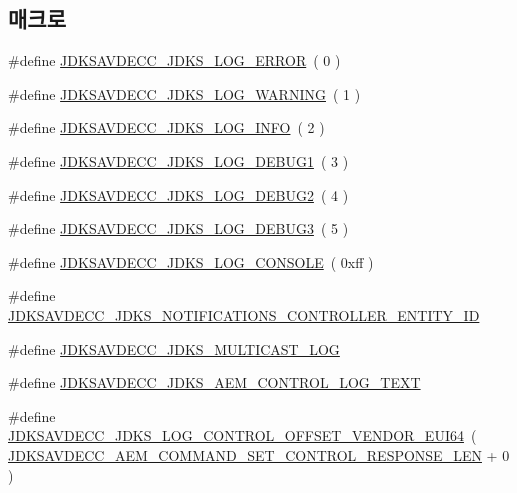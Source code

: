 \subsection*{매크로}
\begin{DoxyCompactItemize}
\item 
\#define \hyperlink{group__jdks__log_gab4244a790ff2c0aa1fa3a077b7b7e935}{J\+D\+K\+S\+A\+V\+D\+E\+C\+C\+\_\+\+J\+D\+K\+S\+\_\+\+L\+O\+G\+\_\+\+E\+R\+R\+OR}~( 0 )
\item 
\#define \hyperlink{group__jdks__log_gab00fb723ba991ceb1e80dfb91b91af5d}{J\+D\+K\+S\+A\+V\+D\+E\+C\+C\+\_\+\+J\+D\+K\+S\+\_\+\+L\+O\+G\+\_\+\+W\+A\+R\+N\+I\+NG}~( 1 )
\item 
\#define \hyperlink{group__jdks__log_ga21fdc8ed4fe36814540b461a4b72d9eb}{J\+D\+K\+S\+A\+V\+D\+E\+C\+C\+\_\+\+J\+D\+K\+S\+\_\+\+L\+O\+G\+\_\+\+I\+N\+FO}~( 2 )
\item 
\#define \hyperlink{group__jdks__log_ga64e80ebc82c6c88ac37806ac0da6cef0}{J\+D\+K\+S\+A\+V\+D\+E\+C\+C\+\_\+\+J\+D\+K\+S\+\_\+\+L\+O\+G\+\_\+\+D\+E\+B\+U\+G1}~( 3 )
\item 
\#define \hyperlink{group__jdks__log_ga4ed4c60943c2bf8efe5670badab16a79}{J\+D\+K\+S\+A\+V\+D\+E\+C\+C\+\_\+\+J\+D\+K\+S\+\_\+\+L\+O\+G\+\_\+\+D\+E\+B\+U\+G2}~( 4 )
\item 
\#define \hyperlink{group__jdks__log_ga04ac1c6799542605464015ecb9bbd207}{J\+D\+K\+S\+A\+V\+D\+E\+C\+C\+\_\+\+J\+D\+K\+S\+\_\+\+L\+O\+G\+\_\+\+D\+E\+B\+U\+G3}~( 5 )
\item 
\#define \hyperlink{group__jdks__log_ga9ced78c29484cde4fb6d621e8be5c65b}{J\+D\+K\+S\+A\+V\+D\+E\+C\+C\+\_\+\+J\+D\+K\+S\+\_\+\+L\+O\+G\+\_\+\+C\+O\+N\+S\+O\+LE}~( 0xff )
\item 
\#define \hyperlink{group__jdks__log_ga1eb9143013c3f45edaa1605695e5a6f1}{J\+D\+K\+S\+A\+V\+D\+E\+C\+C\+\_\+\+J\+D\+K\+S\+\_\+\+N\+O\+T\+I\+F\+I\+C\+A\+T\+I\+O\+N\+S\+\_\+\+C\+O\+N\+T\+R\+O\+L\+L\+E\+R\+\_\+\+E\+N\+T\+I\+T\+Y\+\_\+\+ID}
\item 
\#define \hyperlink{group__jdks__log_gabc09ee25e033c56beeee59de6ce2fc6a}{J\+D\+K\+S\+A\+V\+D\+E\+C\+C\+\_\+\+J\+D\+K\+S\+\_\+\+M\+U\+L\+T\+I\+C\+A\+S\+T\+\_\+\+L\+OG}
\item 
\#define \hyperlink{group__jdks__log_ga2540d677bf8f7ee2ab29e06e74c384bf}{J\+D\+K\+S\+A\+V\+D\+E\+C\+C\+\_\+\+J\+D\+K\+S\+\_\+\+A\+E\+M\+\_\+\+C\+O\+N\+T\+R\+O\+L\+\_\+\+L\+O\+G\+\_\+\+T\+E\+XT}
\item 
\#define \hyperlink{group__jdks__log_gaa09f0dec1864081c2abbc426b9e387fd}{J\+D\+K\+S\+A\+V\+D\+E\+C\+C\+\_\+\+J\+D\+K\+S\+\_\+\+L\+O\+G\+\_\+\+C\+O\+N\+T\+R\+O\+L\+\_\+\+O\+F\+F\+S\+E\+T\+\_\+\+V\+E\+N\+D\+O\+R\+\_\+\+E\+U\+I64}~( \hyperlink{group__command__set__control__response_gad54c9d8dd021fce5cb24c880401d316f}{J\+D\+K\+S\+A\+V\+D\+E\+C\+C\+\_\+\+A\+E\+M\+\_\+\+C\+O\+M\+M\+A\+N\+D\+\_\+\+S\+E\+T\+\_\+\+C\+O\+N\+T\+R\+O\+L\+\_\+\+R\+E\+S\+P\+O\+N\+S\+E\+\_\+\+L\+EN} + 0 )

\end{DoxyCompactItemize}
